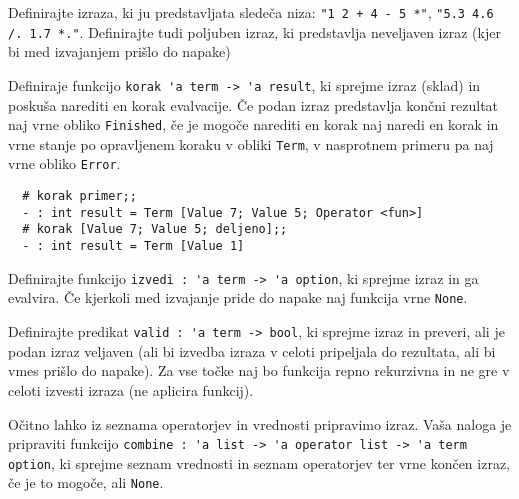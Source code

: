 \documentclass[arhiv]{../izpit}
\begin{document}
\podnaloga Definirajte izraza, ki ju predstavljata sledeča niza: \verb|"1 2 + 4 - 5 *"|, \verb|"5.3 4.6 /. 1.7 *."|. 
   Definirajte tudi poljuben izraz, ki predstavlja neveljaven izraz (kjer bi med izvajanjem prišlo do napake)


\podnaloga
Definiraje funkcijo \verb|korak 'a term -> 'a result|, ki sprejme izraz (sklad) in poskuša narediti en korak evalvacije.
Če podan izraz predstavlja končni rezultat naj vrne obliko \verb|Finished|, 
če je mogoče narediti en korak naj naredi en korak in vrne stanje po opravljenem koraku v obliki \verb|Term|, 
v nasprotnem primeru pa naj vrne obliko \verb|Error|.

\begin{verbatim}
  # korak primer;;
  - : int result = Term [Value 7; Value 5; Operator <fun>]
  # korak [Value 7; Value 5; deljeno];;
  - : int result = Term [Value 1]

\end{verbatim}


\podnaloga
Definirajte funkcijo \verb|izvedi : 'a term -> 'a option|, ki sprejme izraz in ga evalvira. 
Če kjerkoli med izvajanje pride do napake naj funkcija vrne \verb|None|.


\podnaloga
Definirajte predikat \verb|valid : 'a term -> bool|, ki sprejme izraz in preveri, 
ali je podan izraz veljaven (ali bi izvedba izraza v celoti pripeljala do rezultata, 
ali bi vmes prišlo do napake). 
Za vse točke naj bo funkcija repno rekurzivna in ne gre v celoti izvesti izraza (ne aplicira funkcij).


\podnaloga
Očitno lahko iz seznama operatorjev in vrednosti pripravimo izraz. 
Vaša naloga je pripraviti funkcijo \verb|combine : 'a list -> 'a operator list -> 'a term option|, 
ki sprejme seznam vrednosti in seznam operatorjev ter vrne končen izraz, če je to mogoče, ali \verb|None|.
\end{document}
